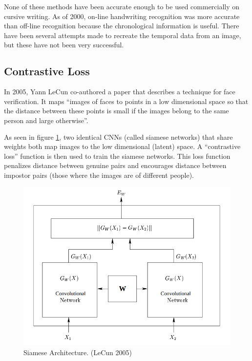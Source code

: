 None of these methods have been accurate enough to be used commercially on cursive writing\cite{handwriting_survey}.
As of 2000, on-line handwriting recognition was more accurate than off-line recognition because the chronological information is useful\cite{handwriting_survey}.
There have been several attempts made to recreate the temporal data from an image, but these have not been very successful\cite{handwriting_survey}.


\subsection{Contrastive Loss}\label{sec:contrastive_loss}
In 2005, Yann LeCun co-authored a paper that describes a technique for face verification.
It maps ``images of faces to points in a low dimensional space so that the distance between these points is small if the images belong to the same person and large otherwise''\cite{LeCun}.


As seen in figure \ref{fig:siamese}, two identical CNNs (called siamese networks) that share weights both map images to the low dimensional (latent) space.
A ``contrastive loss'' function is then used to train the siamese networks.
This loss function penalizes distance between genuine pairs and encourages distance between impostor pairs (those where the images are of different people)\cite{LeCun}.
\begin{figure}[h]
    \begin{center}
        \includegraphics[width=0.8\linewidth]{siamese_architecture.png}
    \end{center}
    \caption{Siamese Architecture. (LeCun 2005)}
    \label{fig:siamese}
\end{figure}

